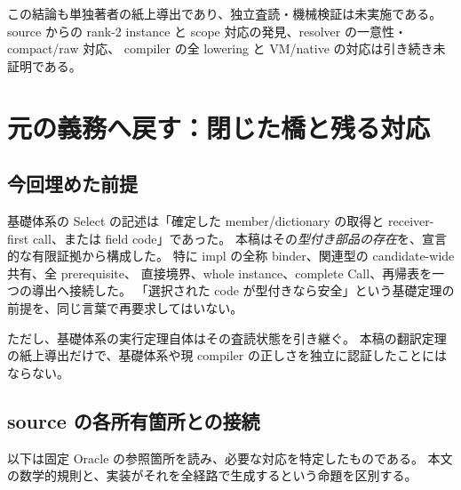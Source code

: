 \documentclass[11pt,a4paper]{article}
\begin{document}
この結論も単独著者の紙上導出であり、独立査読・機械検証は未実施である。
source からの rank-2 instance と scope 対応の発見、resolver の一意性・compact/raw 対応、
compiler の全 lowering と VM/native の対応は引き続き未証明である。

\section{元の義務へ戻す：閉じた橋と残る対応}
\label{sec:remaining}

\subsection{今回埋めた前提}

基礎体系の Select の記述は「確定した member/dictionary の取得と receiver-first call、または field code」であった。
本稿はその\emph{型付き部品の存在}を、宣言的な有限証拠から構成した。
特に impl の全称 binder、関連型の candidate-wide 共有、全 prerequisite、
直接境界、whole instance、complete Call、再帰表を一つの導出へ接続した。
「選択された code が型付きなら安全」という基礎定理の前提を、同じ言葉で再要求してはいない。

ただし、基礎体系の実行定理自体はその査読状態を引き継ぐ。
本稿の翻訳定理の紙上導出だけで、基礎体系や現 compiler の正しさを独立に認証したことにはならない。

\subsection{source の各所有箇所との接続}

以下は固定 Oracle の参照箇所を読み、必要な対応を特定したものである。
本文の数学的規則と、実装がそれを全経路で生成するという命題を区別する。
\end{document}
